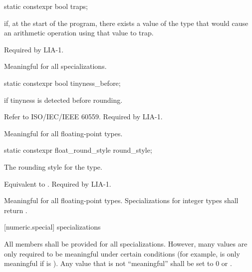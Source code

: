 %
\begin{itemdecl}
static constexpr bool traps;
\end{itemdecl}

\begin{itemdescr}
\pnum
{}
if, at the start of the program, there exists a value of the type that would cause
an arithmetic operation using that value to trap.
\begin{footnote}
Required by LIA-1.
\end{footnote}

\pnum
Meaningful for all specializations.
\end{itemdescr}

%
\begin{itemdecl}
static constexpr bool tinyness_before;
\end{itemdecl}

\begin{itemdescr}
\pnum
{}
if tinyness is detected before rounding.
\begin{footnote}
Refer to
ISO/IEC/IEEE 60559.
Required by LIA-1.
\end{footnote}

\pnum
Meaningful for all floating-point types.
\end{itemdescr}

%
\begin{itemdecl}
static constexpr float_round_style round_style;
\end{itemdecl}

\begin{itemdescr}
\pnum
The rounding style for the type.
\begin{footnote}
Equivalent to .
Required by LIA-1.
\end{footnote}

\pnum
Meaningful for all floating-point types.
Specializations for integer types shall return
.
\end{itemdescr}

[numeric.special]{ specializations}

\pnum
All members shall be provided for all specializations.
However, many values are only required to be meaningful under certain
conditions
(for example,
is only meaningful if
is
).
Any value that is not ``meaningful'' shall be set to 0 or
.

